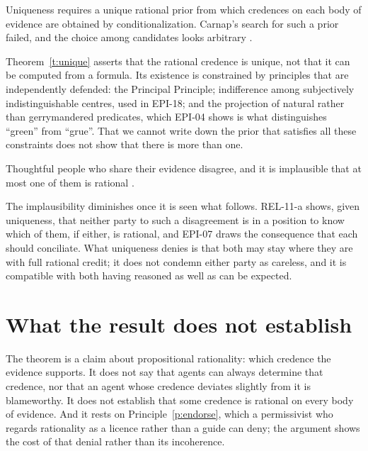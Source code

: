 \documentclass{situationist-preprint}
\begin{document}
\begin{objection}
Uniqueness requires a unique rational prior from which credences on each body of evidence are obtained by conditionalization. Carnap's search for such a prior failed, and the choice among candidates looks arbitrary \citep{Meacham2014}.
\end{objection}

\begin{reply}
Theorem~\ref{t:unique} asserts that the rational credence is unique, not that it can be computed from a formula. Its existence is constrained by principles that are independently defended: the Principal Principle; indifference among subjectively indistinguishable centres, used in EPI-18; and the projection of natural rather than gerrymandered predicates, which EPI-04 shows is what distinguishes \enquote{green} from \enquote{grue}. That we cannot write down the prior that satisfies all these constraints does not show that there is more than one.
\end{reply}

\begin{objection}
Thoughtful people who share their evidence disagree, and it is implausible that at most one of them is rational \citep{Rosen2001}.
\end{objection}

\begin{reply}
The implausibility diminishes once it is seen what follows. REL-11-a shows, given uniqueness, that neither party to such a disagreement is in a position to know which of them, if either, is rational, and EPI-07 draws the consequence that each should conciliate. What uniqueness denies is that both may stay where they are with full rational credit; it does not condemn either party as careless, and it is compatible with both having reasoned as well as can be expected.
\end{reply}

\section{What the result does not establish}

The theorem is a claim about propositional rationality: which credence the evidence supports. It does not say that agents can always determine that credence, nor that an agent whose credence deviates slightly from it is blameworthy. It does not establish that some credence is rational on every body of evidence. And it rests on Principle~\ref{p:endorse}, which a permissivist who regards rationality as a licence rather than a guide can deny; the argument shows the cost of that denial rather than its incoherence.
\end{document}
